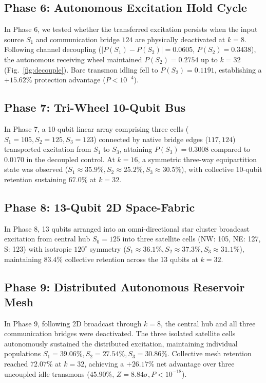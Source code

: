 \documentclass[aps,pra,twocolumn,superscriptaddress,floatfix,10pt]{revtex4-2}
\begin{document}
\subsection{Phase 6: Autonomous Excitation Hold Cycle}
In Phase 6, we tested whether the transferred excitation persists when the input source $S_1$ and communication bridge $124$ are physically deactivated at $k=8$. Following channel decoupling ($|P(S_1)-P(S_2)| = 0.0605$, $P(S_2) = 0.3438$), the autonomous receiving wheel maintained $P(S_2) = 0.2754$ up to $k=32$ (Fig.~\ref{fig:decouple}). Bare transmon idling fell to $P(S_2) = 0.1191$, establishing a $+15.62\%$ protection advantage ($P < 10^{-4}$).

\subsection{Phase 7: Tri-Wheel 10-Qubit Bus}
In Phase 7, a 10-qubit linear array comprising three cells ($S_1=105, S_2=125, S_3=123$) connected by native bridge edges ($117, 124$) transported excitation from $S_1$ to $S_3$, attaining $P(S_3) = 0.3008$ compared to $0.0170$ in the decoupled control. At $k=16$, a symmetric three-way equipartition state was observed ($S_1 \approx 35.9\%, S_2 \approx 25.2\%, S_3 \approx 30.5\%$), with collective 10-qubit retention sustaining $67.0\%$ at $k=32$.

\subsection{Phase 8: 13-Qubit 2D Space-Fabric}
In Phase 8, 13 qubits arranged into an omni-directional star cluster broadcast excitation from central hub $S_0 = 125$ into three satellite cells (NW: 105, NE: 127, S: 123) with isotropic $120^\circ$ symmetry ($S_1 \approx 36.1\%, S_2 \approx 37.3\%, S_3 \approx 31.1\%$), maintaining $83.4\%$ collective retention across the 13 qubits at $k=32$.

\subsection{Phase 9: Distributed Autonomous Reservoir Mesh}
In Phase 9, following 2D broadcast through $k=8$, the central hub and all three communication bridges were deactivated. The three isolated satellite cells autonomously sustained the distributed excitation, maintaining individual populations $S_1 = 39.06\%, S_2 = 27.54\%, S_3 = 30.86\%$. Collective mesh retention reached $72.07\%$ at $k=32$, achieving a $+26.17\%$ net advantage over three uncoupled idle transmons ($45.90\%$, $Z = 8.84\sigma, P < 10^{-18}$).
\end{document}
